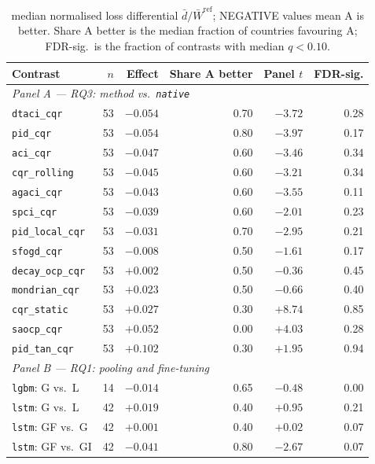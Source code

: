 \begin{table}[t]
\centering
\caption{%
         median normalised loss differential $\bar d/\bar W^{\text{ref}}$;
         NEGATIVE values mean A is better. Share A better is the median
         fraction of countries favouring A; FDR-sig.\ is the fraction of
         contrasts with median $q<0.10$.}
\label{tab:res_contrasts}
\begin{tabular}{lrrrrr}
\toprule
Contrast & $n$ & Effect & Share A better & Panel $t$ & FDR-sig. \\
\midrule
\multicolumn{6}{l}{\emph{Panel A --- RQ3: method vs.\ \texttt{native}}} \\
\texttt{dtaci\_cqr}      & 53 & $-0.054$ & 0.70 & $-3.72$ & 0.28 \\
\texttt{pid\_cqr}        & 53 & $-0.054$ & 0.80 & $-3.97$ & 0.17 \\
\texttt{aci\_cqr}        & 53 & $-0.047$ & 0.60 & $-3.46$ & 0.34 \\
\texttt{cqr\_rolling}    & 53 & $-0.045$ & 0.60 & $-3.21$ & 0.34 \\
\texttt{agaci\_cqr}      & 53 & $-0.043$ & 0.60 & $-3.55$ & 0.11 \\
\texttt{spci\_cqr}       & 53 & $-0.039$ & 0.60 & $-2.01$ & 0.23 \\
\texttt{pid\_local\_cqr} & 53 & $-0.031$ & 0.70 & $-2.95$ & 0.21 \\
\texttt{sfogd\_cqr}      & 53 & $-0.008$ & 0.50 & $-1.61$ & 0.17 \\
\texttt{decay\_ocp\_cqr} & 53 & $+0.002$ & 0.50 & $-0.36$ & 0.45 \\
\texttt{mondrian\_cqr}   & 53 & $+0.023$ & 0.50 & $-0.66$ & 0.40 \\
\texttt{cqr\_static}     & 53 & $+0.027$ & 0.30 & $+8.74$ & 0.85 \\
\texttt{saocp\_cqr}      & 53 & $+0.052$ & 0.00 & $+4.03$ & 0.28 \\
\texttt{pid\_tan\_cqr}   & 53 & $+0.102$ & 0.30 & $+1.95$ & 0.94 \\
\midrule
\multicolumn{6}{l}{\emph{Panel B --- RQ1: pooling and fine-tuning}} \\
\texttt{lgbm}: G vs.\ L      & 14 & $-0.014$ & 0.65 & $-0.48$ & 0.00 \\
\texttt{lstm}: G vs.\ L      & 42 & $+0.019$ & 0.40 & $+0.95$ & 0.21 \\
\texttt{lstm}: GF vs.\ G     & 42 & $+0.001$ & 0.40 & $+0.02$ & 0.07 \\
\texttt{lstm}: GF vs.\ GI    & 42 & $-0.041$ & 0.80 & $-2.67$ & 0.07 \\

\end{tabular}
\end{table}
